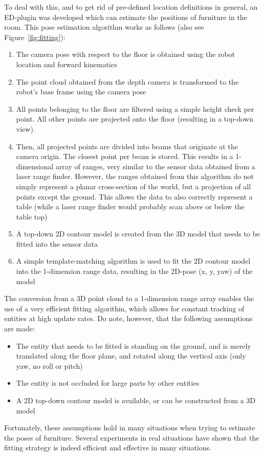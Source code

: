 To deal with this, and to get rid of pre-defined location definitions in general, an ED-plugin was developed which can estimate the positions of furniture in the room. This pose estimation algorithm works as follows (also see Figure~\ref{fig:fitting}):

\begin{enumerate}
    \item The camera pose with respect to the floor is obtained using the robot location and forward kinematics
    \item The point cloud obtained from the depth camera is transformed to the robot's base frame using the camera pose
    \item All points belonging to the floor are filtered using a simple height check per point. All other points are projected onto the floor (resulting in a top-down view).
    \item Then, all projected points are divided into beams that originate at the camera origin. The closest point per beam is stored. This results in a 1-dimensional array of ranges, very similar to the sensor data obtained from a laser range finder. However, the ranges obtained from this algorithm do not simply represent a planar cross-section of the world, but a projection of all points except the ground. This allows the data to also correctly represent a table (while a laser range finder would probably scan above or below the table top)
    \item A top-down 2D contour model is created from the 3D model that needs to be fitted into the sensor data
    \item A simple template-matching algorithm is used to fit the 2D contour model into the 1-dimension range data, resulting in the 2D-pose (x, y, yaw) of the model 
\end{enumerate}

The conversion from a 3D point cloud to a 1-dimension range array enables the use of a very efficient fitting algorithm, which allows for constant tracking of entities at high update rates. Do note, however, that the following assumptions are made:

\begin{itemize}
    \item The entity that needs to be fitted is standing on the ground, and is merely translated along the floor plane, and rotated along the vertical axis (only yaw, no roll or pitch)
    \item The entity is not occluded for large parts by other entities
    \item A 2D top-down contour model is available, or can be constructed from a 3D model
\end{itemize}

Fortunately, these assumptions hold in many situations when trying to estimate the poses of furniture. Several experiments in real situations have shown that the fitting strategy is indeed efficient and effective in many situations.